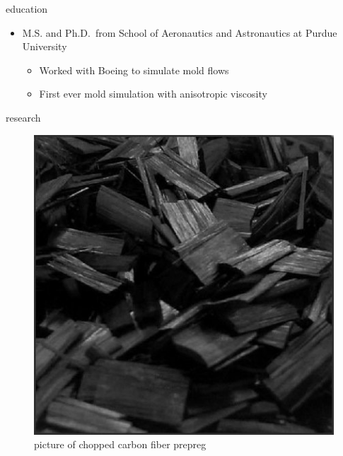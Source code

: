 \documentclass[
  letterpaper,
  ignorenonframetext,
  aspectratio=43,
  handout,
  12pt]{beamer}
\providecommand{\tightlist}{%
  \setlength{\itemsep}{0pt}\setlength{\parskip}{0pt}}
\providecommand{\tightlist}{%
\setlength{\itemsep}{0pt}\setlength{\parskip}{0pt}}
\let\Oldincludegraphics\includegraphics
\renewcommand{\includegraphics}[2][]{\Oldincludegraphics[width=\textwidth,height=0.7\textheight,keepaspectratio]{#2}}
\begin{document}
\begin{frame}{education}
\protect\hypertarget{education-1}{}
\begin{itemize}
\tightlist
\item
  M.S. and Ph.D.~from School of Aeronautics and Astronautics at Purdue
  University

  \begin{itemize}
  \tightlist
  \item
    Worked with Boeing to simulate mold flows
  \item
    First ever mold simulation with anisotropic viscosity
  \end{itemize}
\end{itemize}
\end{frame}

\begin{frame}{research}
\protect\hypertarget{research}{}
\begin{figure}
\centering
\includegraphics{../images/Formosa_Chopped_Carbon_Fiber_CSc_bw.jpg}
\caption{picture of chopped carbon fiber prepreg}
\end{figure}
\end{frame}
\end{document}

